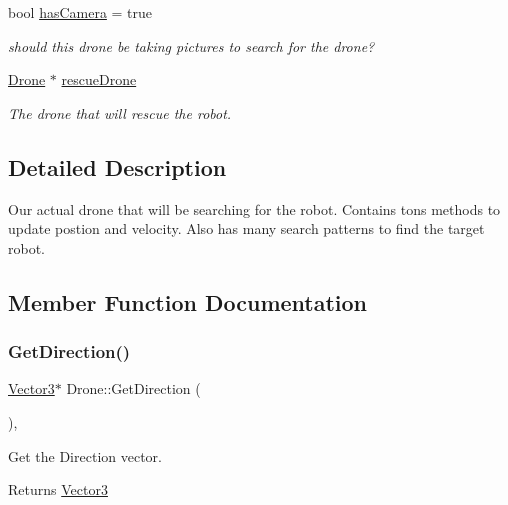 \begin{DoxyCompactItemize}
\mbox{\label{classDrone_a5ec481b8bb607b969903b41eaafd0769}} 
bool \hyperlink{classDrone_a5ec481b8bb607b969903b41eaafd0769}{has\+Camera} = true
\begin{DoxyCompactList}\small\item\em should this drone be taking pictures to search for the drone? \end{DoxyCompactList}\item 
\mbox{\label{classDrone_ad5f726ad8f4c40ecf159ddb218346029}} 
\hyperlink{classDrone}{Drone} $\ast$ \hyperlink{classDrone_ad5f726ad8f4c40ecf159ddb218346029}{rescue\+Drone}
\begin{DoxyCompactList}\small\item\em The drone that will rescue the robot. \end{DoxyCompactList}\end{DoxyCompactItemize}


\subsection{Detailed Description}
Our actual drone that will be searching for the robot. Contains tons methods to update postion and velocity. Also has many search patterns to find the target robot. 

\subsection{Member Function Documentation}
\mbox{\label{classDrone_ad81e02cd82137d51ce68f4698812c949}} 
\subsubsection{\texorpdfstring{Get\+Direction()}{GetDirection()}}
{\footnotesize\ttfamily \hyperlink{classVector3}{Vector3}$\ast$ Drone\+::\+Get\+Direction (\begin{DoxyParamCaption}{ }\end{DoxyParamCaption})\hspace{0.3cm}{\ttfamily [inline]}, {\ttfamily [virtual]}}



Get the Direction vector. 

\begin{DoxyReturn}{Returns}
\hyperlink{classVector3}{Vector3} 
\end{DoxyReturn}


